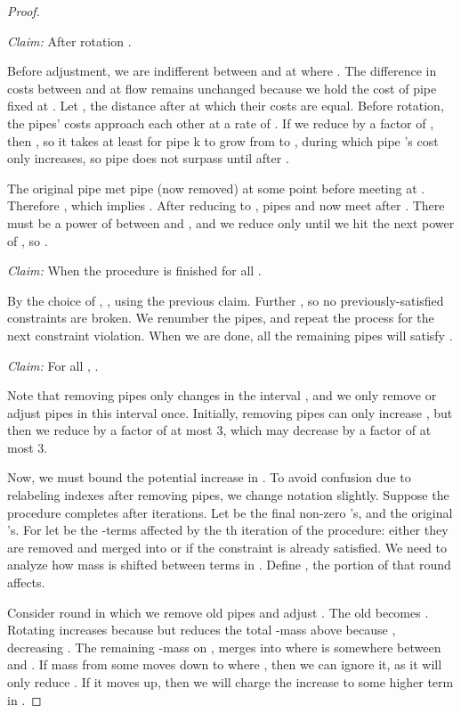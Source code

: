 \documentclass[11pt]{article}
\begin{document}
\begin{proof}
\begin{description}

\item{\emph{Claim:}}
After rotation .

Before adjustment, we are indifferent between  and  at  
where . 
The difference in costs between  and  at  flow remains unchanged  
because we hold the cost of pipe  fixed at .
Let , the distance after  at which their costs are equal.
Before rotation, the pipes' costs approach each other at a rate of .
If we reduce  by a factor of , then , 
so it takes at least  for pipe k to grow from  to , during which pipe 's cost only increases, so pipe  does not surpass  until after .

The original pipe  met pipe  (now removed) at some point  before meeting  at .
Therefore , which implies .
After reducing  to , pipes  and  now meet after .
There must be a power of  between  and , and we reduce  only until we hit the next power of , so .

\item{\emph{Claim:}} When the procedure is finished  for all .

By the choice of , , using the previous claim.  
Further , so no previously-satisfied constraints are broken.  We renumber the pipes, and repeat the process for the next constraint violation.  When we are done, all the remaining pipes will satisfy .

\item{\emph{Claim:}} For all , .

Note that removing pipes  only changes  in the interval , and we only remove or adjust pipes in this interval once.  Initially, removing pipes can only increase , but then we reduce  by a factor of at most 3, which may decrease  by a factor of at most 3.
\end{description}

Now, we must bound the potential increase in .  
To avoid confusion due to relabeling indexes after removing pipes, we change notation slightly.  Suppose the procedure completes after  iterations.  
Let  be the final non-zero 's, and  the original 's.  
For  let  be the -terms affected by the th iteration of the procedure: either they are removed and merged into  or  if the constraint is already satisfied.
We need to analyze how mass is shifted between terms in .  Define , the portion of  that round  affects.


Consider round  in which we remove old pipes  and adjust .  The old  becomes .  Rotating  increases  because  but reduces the total -mass above  because , decreasing .  
The remaining -mass on ,  merges into  where  is somewhere between  and .
If mass from some  moves down to  where , then we can ignore it, as it will only reduce .  If it moves up, then we will charge the increase to some higher term in .


\end{proof}
\end{document}
